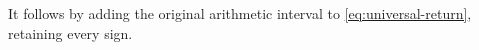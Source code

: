 It follows by adding the original arithmetic interval to
\eqref{eq:universal-return}, retaining every sign.